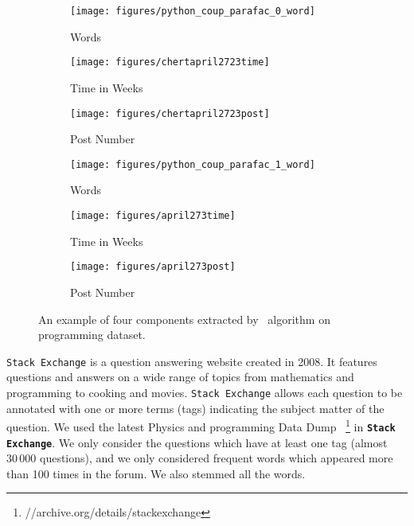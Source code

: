 \begin{figure*}
\captionsetup[subfigure]{aboveskip=-1pt,belowskip=-1pt}
  \centering   
\begin{subfigure}[b]{0.31\textwidth} 
                \texttt{[image: figures/python\_coup\_parafac\_0\_word]}
                \caption{Words}
                \label{fig:python_coup_parafac_c1word}
        \end{subfigure}%
        \begin{subfigure}[b]{0.31\textwidth}
                \texttt{[image: figures/chertapril2723time]}
                \caption{Time in Weeks}
                \label{fig:python_coup_parafac_c1time}
        \end{subfigure}%
\begin{subfigure}[b]{0.31\textwidth}
                \texttt{[image: figures/chertapril2723post]} 
                \caption{Post Number}
                \label{fig:python_coup_parafac_c1post}
        \end{subfigure}%
        
                \begin{subfigure}[b]{0.31\textwidth}
                \texttt{[image: figures/python\_coup\_parafac\_1\_word]}
                \caption{Words}
                \label{fig:python_coup_parafac_c2word}
        \end{subfigure}%
        \begin{subfigure}[b]{0.31\textwidth}
                \texttt{[image: figures/april273time]}
                \caption{Time in Weeks}
                \label{fig:python_coup_parafac_c2time}
        \end{subfigure}%
\begin{subfigure}[b]{0.31\textwidth}
                \texttt{[image: figures/april273post]}
                \caption{Post Number}
                \label{fig:python_coup_parafac_c2post}
        \end{subfigure}%
        \caption{\label{fig:python_coup_parafac}An example of four components extracted by \ourAlgo\ algorithm on programming dataset. 
        }
\end{figure*}
\vspace{-0pt}

\texttt{Stack Exchange} is a question answering website created in 2008. It features questions and
answers on a wide range of topics from mathematics and programming to cooking and movies.  \texttt{Stack
Exchange} allows each question  to be annotated with one or more terms (tags) indicating the subject
matter of the question.  
We used the latest Physics and programming Data Dump \
\footnote{//archive.org/details/stackexchange} in \textbf{\texttt{Stack
Exchange}}. We only consider the questions which have at least one tag (almost $30\,000$ questions),  and
we only considered frequent words which appeared more than 100 times in the forum. We also stemmed all the words. 

